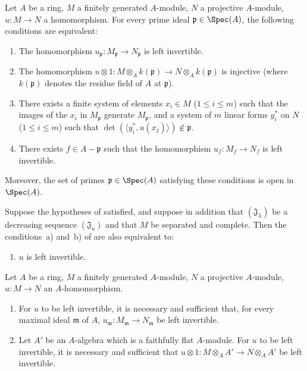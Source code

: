 \begin{corollary}[19.1.12]
\label{0.19.1.12}
Let $A$ be a ring, $M$ a finitely generated $A$-module, $N$ a projective $A$-module, $u:M\to N$ a homomorphism.
For every prime ideal $\mathfrak{p}\in\Spec(A)$, the following conditions are equivalent:
\begin{enumerate}
  \item[a)] The homomorphism $u_\mathfrak{p}:M_\mathfrak{p}\to N_\mathfrak{p}$ is left invertible.
  \item[b)] The homomorphism $u\otimes 1:M\otimes_A k(\mathfrak{p})\to N\otimes_A k(\mathfrak{p})$ is injective (where $k(\mathfrak{p})$ denotes the residue field of $A$ at $\mathfrak{p}$).
  \item[c)] There exists a finite system of elements $x_i\in M$ ($1\leq i\leq m$) such that the images of the $x_i$ in $M_\mathfrak{p}$ generate $M_\mathfrak{p}$, and a system of $m$ linear forms $y_i^*$ on $N$ ($1\leq i\leq m$) such that $\det(\langle y_i^*,u(x_j)\rangle)\notin\mathfrak{p}$.
  \item[d)] There exists $f\in A-\mathfrak{p}$ such that the homomorphism $u_f:M_f\to N_f$ is left invertible.
\end{enumerate}
Moreover, the set of primes $\mathfrak{p}\in\Spec(A)$ satisfying these conditions is open in $\Spec(A)$.
\end{corollary}

\begin{proposition}[19.1.13]
\label{0.19.1.13}
Suppose the hypotheses of  satisfied, and suppose in addition that $(\mathfrak{J}_\lambda)$ be a decreasing sequence $(\mathfrak{J}_n)$ and that $M$ be separated and complete.
Then the conditions~a) and~b) of  are also equivalent to:
\begin{enumerate}
  \item[c)] $u$ is left invertible.
\end{enumerate}
\end{proposition}

\begin{proposition}[19.1.14]
\label{0.19.1.14}
Let $A$ be a ring, $M$ a finitely generated $A$-module, $N$ a projective $A$-module, $u:M\to N$ an $A$-homomorphism.
\begin{enumerate}
  \item[(i)] For $u$ to be left invertible, it is necessary and sufficient that, for every maximal ideal $\mathfrak{m}$ of $A$, $u_\mathfrak{m}:M_\mathfrak{m}\to N_\mathfrak{m}$ be left invertible.
  \item[(ii)] Let $A'$ be an $A$-algebra which is a faithfully flat $A$-module.
  For $u$ to be left invertible, it is necessary and sufficient that $u\otimes 1:M\otimes_A A'\to N\otimes_A A'$ be left invertible.
\end{enumerate}
\end{proposition}

